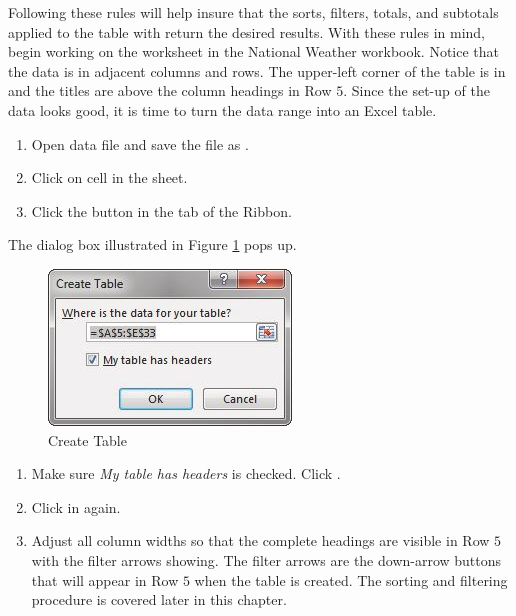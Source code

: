 Following these rules will help insure that the sorts, filters, totals, and subtotals applied to the table with return the desired results. With these rules in mind, begin working on the  worksheet in the National Weather workbook. Notice that the data is in adjacent columns and rows. The upper-left corner of the table is in  and the titles are above the column headings in Row $ 5 $. Since the set-up of the data looks good, it is time to turn the data range into an Excel table.

\begin{enumerate}
	\item Open data file  and save the file as .
	\item Click on cell  in the  sheet.
	\item Click the  button in the  tab of the Ribbon.
\end{enumerate}

The dialog box illustrated in Figure \ref{05:fig02} pops up.

\begin{figure}[H]
	\centering
	\includegraphics[width=\maxwidth{.95\linewidth}]{gfx/ch05_fig02}
	\caption{Create Table}
	\label{05:fig02}
\end{figure}

\begin{enumerate}
	\item Make sure \textit{My table has headers} is checked. Click .
	\item Click in  again.
	\item Adjust all column widths so that the complete headings are visible in Row $ 5 $ with the filter arrows showing. The filter arrows are the down-arrow buttons that will appear in Row $ 5 $ when the table is created. The sorting and filtering procedure is covered later in this chapter.
\end{enumerate}

